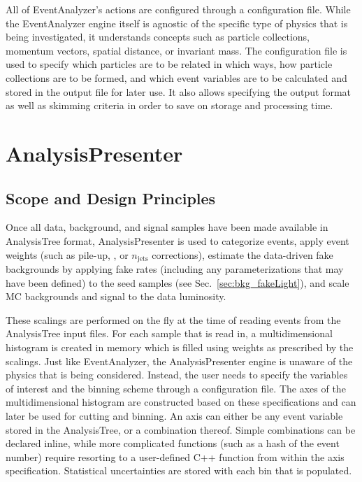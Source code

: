 All of EventAnalyzer's actions are configured through a configuration file. While the EventAnalyzer engine itself is agnostic of the specific type of physics that is being investigated, it understands concepts such as particle collections, momentum vectors, spatial distance, or invariant mass. The configuration file is used to specify which particles are to be related in which ways, how particle collections are to be formed, and which event variables are to be calculated and stored in the output file for later use. It also allows specifying the output format as well as skimming criteria in order to save on storage and processing time.

\section{AnalysisPresenter}
\label{app:Software/AnalysisPresenter}

\subsection{Scope and Design Principles}
Once all data, background, and signal samples have been made available in AnalysisTree format, AnalysisPresenter is used to categorize events, apply event weights (such as pile-up, \pt, or $n_\textrm{jets}$ corrections), estimate the data-driven fake backgrounds by applying fake rates (including any parameterizations that may have been defined) to the seed samples (see Sec.~\ref{sec:bkg_fakeLight}), and scale MC backgrounds and signal to the data luminosity.

These scalings are performed on the fly at the time of reading events from the AnalysisTree input files. For each sample that is read in, a multidimensional histogram is created in memory which is filled using weights as prescribed by the scalings. Just like EventAnalyzer, the AnalysisPresenter engine is unaware of the physics that is being considered. Instead, the user needs to specify the variables of interest and the binning scheme through a configuration file. The axes of the multidimensional histogram are constructed based on these specifications and can later be used for cutting and binning. An axis can either be any event variable stored in the AnalysisTree, or a combination thereof. Simple combinations can be declared inline, while more complicated functions (such as a hash of the event number) require resorting to a user-defined C++ function from within the axis specification. Statistical uncertainties are stored with each bin that is populated.

